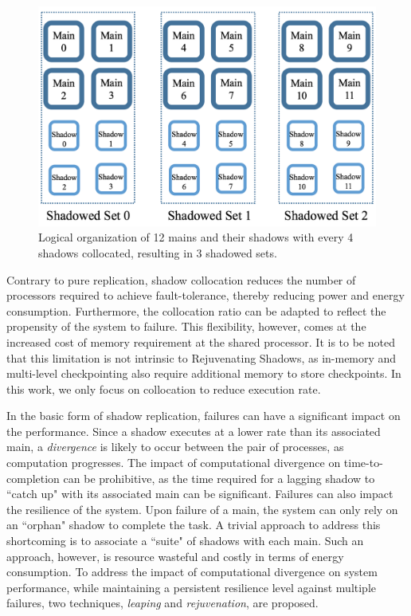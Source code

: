 \begin{figure}[!t]
  \begin{center}
      \includegraphics[width=\columnwidth]{figures/logical_org_hpcc}
  \end{center}
  \vskip -0.2in
  \caption{Logical organization of 12 mains and their shadows with every 4 shadows collocated, resulting in 3 shadowed sets.}
  \label{fig:logical_org}
  \vskip -0.25in
\end{figure}

Contrary to pure replication, shadow collocation reduces the number of processors required to achieve fault-tolerance, thereby reducing power and energy consumption. Furthermore, the collocation ratio can be adapted to reflect the propensity of the system to failure. This flexibility, however, comes at the increased cost of memory requirement at the shared processor. It is to be noted that this limitation is not intrinsic to Rejuvenating Shadows, as in-memory and multi-level checkpointing also require additional memory to store checkpoints. In this work, we only focus on collocation to reduce execution rate. 


In the basic form of shadow replication, failures can have a significant impact on the performance. Since a shadow executes at a lower rate than its associated main, a {\it divergence} is likely to occur between the pair of processes, as computation progresses. The impact of computational divergence on  time-to-completion can be prohibitive, as the time required for a lagging shadow to ``catch up"  with its associated main can be significant. Failures can also impact the resilience of the system. Upon failure of a main, the system can only rely on  an ``orphan" shadow to complete the task. A trivial approach to address this shortcoming is to associate a ``suite" of shadows with each main. Such an approach, however, is resource wasteful and costly in terms of energy consumption. To address the impact of computational divergence on system performance, while maintaining a persistent resilience level against multiple failures, two techniques, \textit{leaping} and \textit{rejuvenation}, are proposed.

